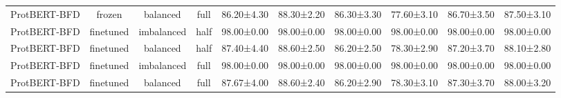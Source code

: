 \begin{tabular}{lccccccccc}
ProtBERT-BFD &         frozen &   balanced &      full &  86.20±4.30 &  88.30±2.20 &  86.30±3.30 &  77.60±3.10 &  86.70±3.50 &  87.50±3.10 \\
ProtBERT-BFD &      finetuned & imbalanced &      half &  98.00±0.00 &  98.00±0.00 &  98.00±0.00 &  98.00±0.00 &  98.00±0.00 &  98.00±0.00 \\
ProtBERT-BFD &      finetuned &   balanced &      half &  87.40±4.40 &  88.60±2.50 &  86.20±2.50 &  78.30±2.90 &  87.20±3.70 &  88.10±2.80 \\
ProtBERT-BFD &      finetuned & imbalanced &      full &  98.00±0.00 &  98.00±0.00 &  98.00±0.00 &  98.00±0.00 &  98.00±0.00 &  98.00±0.00 \\
ProtBERT-BFD &      finetuned &   balanced &      full &  87.67±4.00 &  88.60±2.40 &  86.20±2.90 &  78.30±3.10 &  87.30±3.70 &  88.00±3.20 \\
\bottomrule
\end{tabular}
